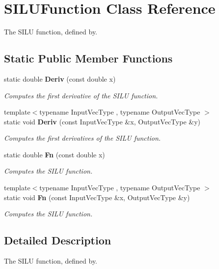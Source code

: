 \section{S\+I\+L\+U\+Function Class Reference}
\label{classmlpack_1_1ann_1_1SILUFunction}


The S\+I\+LU function, defined by.  


\subsection*{Static Public Member Functions}
\begin{DoxyCompactItemize}
\item 
static double \textbf{ Deriv} (const double x)
\begin{DoxyCompactList}\small\item\em Computes the first derivative of the S\+I\+LU function. \end{DoxyCompactList}\item 
{\footnotesize template$<$typename Input\+Vec\+Type , typename Output\+Vec\+Type $>$ }\\static void \textbf{ Deriv} (const Input\+Vec\+Type \&x, Output\+Vec\+Type \&y)
\begin{DoxyCompactList}\small\item\em Computes the first derivatives of the S\+I\+LU function. \end{DoxyCompactList}\item 
static double \textbf{ Fn} (const double x)
\begin{DoxyCompactList}\small\item\em Computes the S\+I\+LU function. \end{DoxyCompactList}\item 
{\footnotesize template$<$typename Input\+Vec\+Type , typename Output\+Vec\+Type $>$ }\\static void \textbf{ Fn} (const Input\+Vec\+Type \&x, Output\+Vec\+Type \&y)
\begin{DoxyCompactList}\small\item\em Computes the S\+I\+LU function. \end{DoxyCompactList}\end{DoxyCompactItemize}


\subsection{Detailed Description}
The S\+I\+LU function, defined by. 

